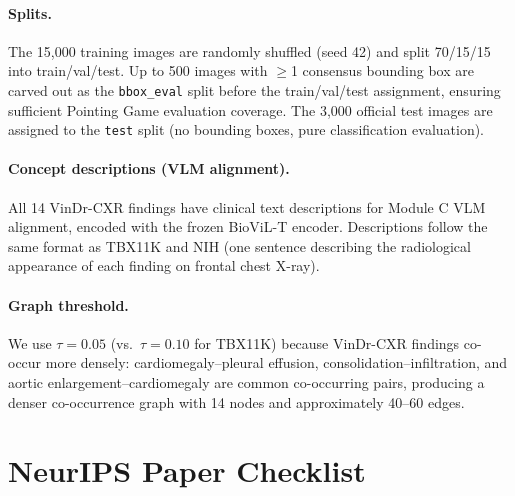 \documentclass{article}
\begin{document}
\paragraph{Splits.}
The 15,000 training images are randomly shuffled (seed 42) and split 70/15/15 into train/val/test. Up to 500 images with $\geq$1 consensus bounding box are carved out as the \texttt{bbox\_eval} split before the train/val/test assignment, ensuring sufficient Pointing Game evaluation coverage. The 3,000 official test images are assigned to the \texttt{test} split (no bounding boxes, pure classification evaluation).

\paragraph{Concept descriptions (VLM alignment).}
All 14 VinDr-CXR findings have clinical text descriptions for Module C VLM alignment, encoded with the frozen BioViL-T encoder. Descriptions follow the same format as TBX11K and NIH (one sentence describing the radiological appearance of each finding on frontal chest X-ray).

\paragraph{Graph threshold.}
We use $\tau=0.05$ (vs.\ $\tau=0.10$ for TBX11K) because VinDr-CXR findings co-occur more densely: cardiomegaly--pleural effusion, consolidation--infiltration, and aortic enlargement--cardiomegaly are common co-occurring pairs, producing a denser co-occurrence graph with 14 nodes and approximately 40--60 edges.

\newpage
\section*{NeurIPS Paper Checklist}
\end{document}
